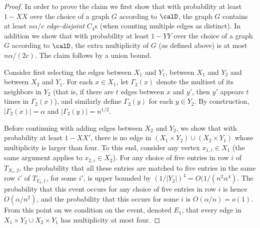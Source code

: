 \begin{proof}
In order to prove the claim we first show that with probability at least $1-XX$ over the choice of a graph $G$ according to $\calD$, the graph $G$ contains at least $n\alpha/c$ \emph{edge-disjoint} $C_4$s (when counting multiple edges as distinct).
In addition we show that with probability at least $1-YY$ over the choice of a graph $G$ according to $\calD$, 
the extra multiplicity of $G$ (as defined above) is at most $n\alpha/(2c)$.
The claim follows by a union bound.


Consider first selecting the edges between $X_1$ and $Y_1$, between $X_1$ and $Y_2$ and between $X_2$ and $Y_1$.
For each $x\in X_1$, let $\Gamma_2(x)$ denote the multiset of its neighbors in $Y_2$ (that is, if there are $t$ edges between $x$ and $y'$, then $y'$ appears $t$ times in $\Gamma_2(x)$), and similarly define $\Gamma_2(y)$ for each $y \in Y_2$. By construction, $|\Gamma_2(x)| = \alpha$ and $|\Gamma_2(y)| = n^{1/2}$.

Before continuing with adding edges between $X_2$ and $Y_2$, we show that with probability at least $1-XX'$, there is no edge in $(X_1\times Y_2) \cup (X_2 \times Y_1)$ whose multiplicity is larger than four. To this end, consider any vertex $x_{1,i} \in X_1$ (the same argument applies to $x_{2,i}\in X_2$). For any choice of five entries in row $i$ of $T_{X_1,2}$, 
the probability that all these entries are matched to five entries
in the same row $i'$ of  $T_{Y_2,1}$, for some $i'$, is upper bounded by $(1/|Y_2|)^4 = O(1/(n^2\alpha^4)$.
The probability that this event occurs for any choice of five entries in row $i$ is hence $O(\alpha/n^2)$, and the probability that this occurs for some $i$ is $O(\alpha/n) = o(1)$.
From this point on we condition on the event, denoted $E_1$, that every edge in $X_1\times Y_2 \cup X_2 \times Y_1$ has multiplicity at most four.


\end{proof}

